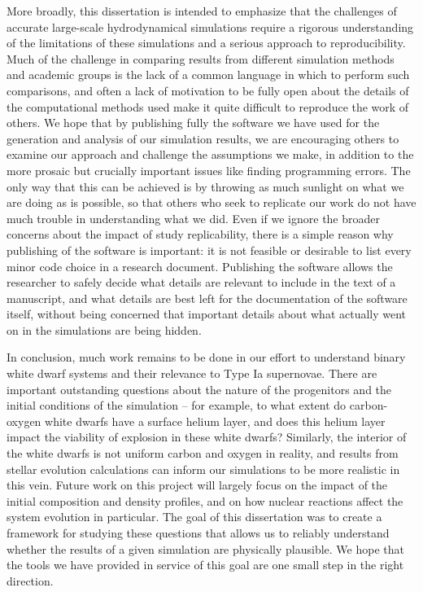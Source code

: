 \documentclass[12pt]{article}
\begin{document}
More broadly, this dissertation is intended to emphasize that the challenges of
accurate large-scale hydrodynamical simulations require a rigorous understanding of
the limitations of these simulations and a serious approach to reproducibility. Much
of the challenge in comparing results from different simulation methods and academic
groups is the lack of a common language in which to perform such comparisons, and often
a lack of motivation to be fully open about the details of the computational methods used
make it quite difficult to reproduce the work of others. We hope that by publishing fully
the software we have used for the generation and analysis of our simulation results, we
are encouraging others to examine our approach and challenge the assumptions we make, in
addition to the more prosaic but crucially important issues like finding programming errors.
The only way that this can be achieved is by throwing as much sunlight on what we are doing
as is possible, so that others who seek to replicate our work do not have much trouble in
understanding what we did. Even if we ignore the broader concerns about the impact of
study replicability, there is a simple reason why publishing of the software is important:
it is not feasible or desirable to list every minor code choice in a research document.
Publishing the software allows the researcher to safely decide what details are relevant
to include in the text of a manuscript, and what details are best left for the documentation
of the software itself, without being concerned that important details about what actually
went on in the simulations are being hidden.

In conclusion, much work remains to be done in our effort to understand binary white dwarf
systems and their relevance to Type Ia supernovae. There are important outstanding questions
about the nature of the progenitors and the initial conditions of the simulation -- for example,
to what extent do carbon-oxygen white dwarfs have a surface helium layer, and does this helium
layer impact the viability of explosion in these white dwarfs? Similarly, the interior of the
white dwarfs is not uniform carbon and oxygen in reality, and results from stellar evolution
calculations can inform our simulations to be more realistic in this vein. Future work on this project
will largely focus on the impact of the initial composition and density profiles, and on how nuclear
reactions affect the system evolution in particular. The goal of this
dissertation was to create a framework for studying these questions that allows us to reliably
understand whether the results of a given simulation are physically plausible. We hope that the
tools we have provided in service of this goal are one small step in the right direction.
\end{document}
